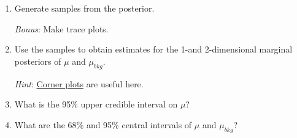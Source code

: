 \documentclass{article}
\begin{document}
\begin{enumerate}
    \item Generate samples from the posterior.

    \textit{Bonus}: Make trace plots.

    \item Use the samples to obtain estimates for the 1-and 2-dimensional marginal posteriors of $\mu$ and $\mu_{bkg}$.

    \textit{Hint}: \href{https://corner.readthedocs.io/en/latest/}{Corner plots} are useful here.

    \item What is the 95\% upper credible interval on $\mu$?

    \item What are the 68\% and 95\% central intervals of $\mu$ and $\mu_{bkg}$?
    

\end{enumerate}
\end{document}
